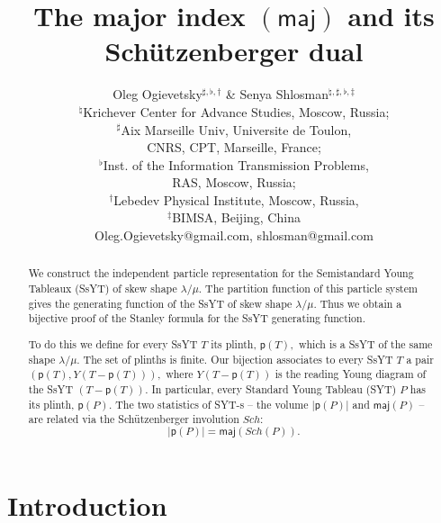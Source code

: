 \documentclass[12pt]{article}%
\begin{document}
\title{\textbf{ The major index }$\left(  \mathsf{maj}\right)  $\textbf{ and its
Sch\"{u}tzenberger dual}}
\author{Oleg Ogievetsky$^{\sharp,\flat,\dag}$ \& Senya Shlosman$^{\natural
,\sharp,\flat,\ddag}$\\$^{\natural}$Krichever Center for Advance Studies, Moscow, Russia;\\$^{\sharp}$Aix Marseille Univ, Universite de Toulon, \\CNRS, CPT, Marseille, France;\\$^{\flat}$Inst. of the Information Transmission Problems, \\RAS, Moscow, Russia;\\$^{\dag}$Lebedev Physical Institute, Moscow, Russia,\\$^{\ddag}$BIMSA, Beijing, China\\Oleg.Ogievetsky@gmail.com, shlosman@gmail.com}
\maketitle

\begin{abstract}
We construct the independent particle representation for the Semistandard
Young Tableaux (SsYT) of skew shape $\lambda/\mu.$ The partition function of
this particle system gives the generating function of the SsYT of skew shape
$\lambda/\mu.$ Thus we obtain a bijective proof of the Stanley formula for the
SsYT generating function.

To do this we define for every SsYT $T$ its plinth, $\mathsf{p}\left(
T\right)  ,$ which is a SsYT of the same shape $\lambda/\mu.$ The set of
plinths is finite. Our bijection associates to every SsYT $T$ a pair $\left(
\mathsf{p}\left(  T\right)  ,Y\left(  T-\mathsf{p}\left(  T\right)  \right)
\right)  ,$ where $Y\left(  T-\mathsf{p}\left(  T\right)  \right)  $ is the
reading Young diagram of the SsYT $\left(  T-\mathsf{p}\left(  T\right)
\right)  $. \newline In particular, every Standard Young Tableau (SYT) $P$ has
its plinth, $\mathsf{p}\left(  P\right)  $. The two statistics of SYT-s -- the
volume $\left\vert \mathsf{p}\left(  P\right)  \right\vert $ and
$\mathsf{maj}\left(  P\right)  $ -- are related via the Sch\"{u}tzenberger
involution $Sch:$%
\[
\left\vert \mathsf{p}\left(  P\right)  \right\vert =\mathsf{maj}\left(
Sch\left(  P\right)  \right)  .
\]


\end{abstract}

\section{Introduction}
\end{document}
